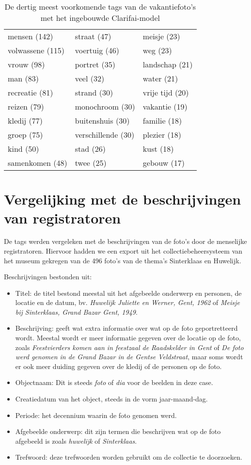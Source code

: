 \begin{table}
	\centering
	\begin{tabular}{*{3}{l}}
		mensen (142) & straat (47) & meisje (23) \\
		volwassene (115) & voertuig (46) & weg (23) \\
		vrouw (98) & portret (35) & landschap (21) \\
		man (83) & veel (32) & water (21) \\
		recreatie (81) & strand (30) & vrije tijd (20) \\
		reizen (79) & monochroom (30) & vakantie (19) \\
		kledij (77) & buitenshuis (30) & familie (18) \\
		groep (75) & verschillende (30) & plezier (18) \\
		kind (50) & stad (26) & kust (18) \\
		samenkomen (48) & twee (25) & gebouw (17) \\
	\end{tabular}
	\caption{De dertig meest voorkomende tags van de vakantiefoto's met het ingebouwde Clarifai-model}
	\label{tab:30-termen-vakantie}
\end{table}

\section{Vergelijking met de beschrijvingen van registratoren}

De tags werden vergeleken met de beschrijvingen van de foto's door de menselijke registratoren. Hiervoor hadden we een export uit het collectiebeheersysteem van het museum gekregen van de 496 foto's van de thema's Sinterklaas en Huwelijk. 

Beschrijvingen bestonden uit:
\begin{itemize}
	\item Titel: de titel bestond meestal uit het afgebeelde onderwerp en personen, de locatie en de datum, bv. \textit{Huwelijk Juliette en Werner, Gent, 1962} of \textit{Meisje bij Sinterklaas, Grand Bazar Gent, 1949}.
	\item Beschrijving: geeft wat extra informatie over wat op de foto geportretteerd wordt.  Meestal wordt er meer informatie gegeven over de locatie op de foto, zoals \textit{Feestvierders komen aan in feestzaal de Raadskelder in Gent} of \textit{De foto werd genomen in de Grand Bazar in de Gentse Veldstraat}, maar soms wordt er ook meer duiding gegeven over de kledij of de personen op de foto.
	\item Objectnaam: Dit is steeds \textit{foto} of \textit{dia} voor de beelden in deze case.
	\item Creatiedatum van het object, steeds in de vorm jaar-maand-dag.
	\item Periode: het decennium waarin de foto genomen werd.
	\item Afgebeelde onderwerp: dit zijn termen die beschrijven wat op de foto afgebeeld is zoals \textit{huwelijk} of \textit{Sinterklaas}.
	\item Trefwoord: deze trefwoorden worden gebruikt om de collectie te doorzoeken. 
\end{itemize}

